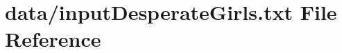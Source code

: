 \hypertarget{inputDesperateGirls_8txt}{}\section{data/input\+Desperate\+Girls.txt File Reference}
\label{inputDesperateGirls_8txt}
